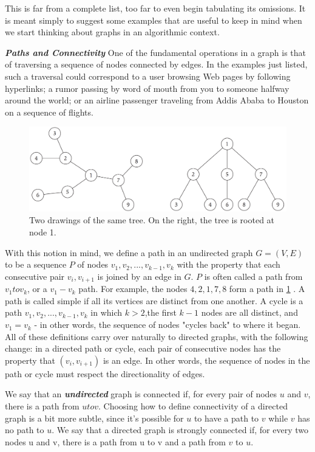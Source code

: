 \documentclass[12pt,a4paper]{book}
\begin{document}
This is far from a complete list, too far to even begin tabulating its omissions. It is meant simply to suggest some examples that are useful to keep in mind when we start thinking about graphs in an algorithmic context.\par
\textbf{\textit{Paths and Connectivity}} One of the fundamental operations in a graph is that of traversing a sequence of nodes connected by edges. In the examples just listed, such a traversal could correspond to a user browsing Web pages by following hyperlinks; a rumor passing by word of mouth from you to someone halfway around the world; or an airline passenger traveling from Addis Ababa to Houston on a sequence of flights.\par
\begin{figure}[h]
    \centering
    \label{fig:simpleGraph1}
    \includegraphics[width=\textwidth]{simpleGraph1}
    \caption{Two drawings of the same tree. On the right, the tree is rooted at node 1.}
\end{figure}
With this notion in mind, we define a path in an undirected graph $G=(V,E)$ to be a sequence $P$ of 
nodes $v_{1},v_{2}, ..., v_{k-1}, v_{k}$ with the property that each consecutive pair $v_{i} , v_{i+1} $ is  joined by an edge in $G$. $P$ is often called a path from $v_{1} to v_{k}$, or a $v_{1}-v_{k}$ path. For example, the nodes $4, 2, 1, 7, 8$ form a path in \ref{fig:simpleGraph1} . A path is called simple if all its vertices are distinct from one another. A cycle is a path $v_{1},v_{2},...,v_{k-1},v_{k}$ in which $k>2$,the first $k−1$ nodes are all distinct, and $v_{1} = v_{k}$ - in other words, the sequence of nodes "cycles back" to where it began. All of these definitions carry over naturally to directed graphs, with the following change: in a directed path or cycle, each pair of consecutive nodes has the property that $(v_{i} , v_{i+1})$ is an edge. In other words, the sequence of nodes in the path or cycle must respect the directionality of edges.\par 
We say that an \textbf{\textit{undirected}} graph is connected if, for every pair of nodes $u$ and $v$, there is a path from $u to v$. Choosing how to define connectivity of a directed graph is a bit more subtle, since it's possible for $u$ to have a path to $v$ while $v$ has no path to $u$. We say that a directed graph is strongly connected if, for every two nodes u and v, there is a path from u to v and a path from $v$ to $u$.\par
\end{document}
